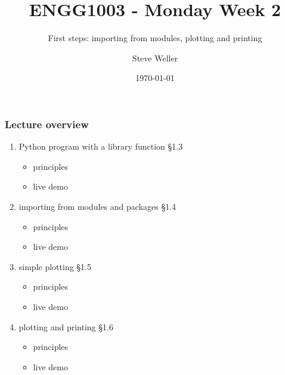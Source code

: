 \documentclass[14pt]{beamer}
\title{ENGG1003 - Monday Week 2}
\subtitle{First steps: importing from modules, plotting and printing}
\author{Steve Weller}
\institute{University of Newcastle}
\date{\today}
\newcommand\red[1]{{\color{red} #1}}
\begin{document}
\titlepage


\begin{frame}[fragile]
\frametitle{Lecture overview}
\begin{enumerate}
\item Python program with a library function \red{\S1.3}
	\begin{itemize}
		\item principles
		\item live demo
	\end{itemize}
\item importing from modules and packages \red{\S1.4}
		\begin{itemize}
		\item principles
		\item live demo
	\end{itemize}
	
\item simple plotting \red{\S1.5} 
	\begin{itemize}
			\item principles
		\item live demo
	\end{itemize}
	
\item plotting and printing \red{\S1.6}
	\begin{itemize}
	\item principles
	\item live demo
	\end{itemize}
\end{enumerate}

\end{frame}

\end{document}
